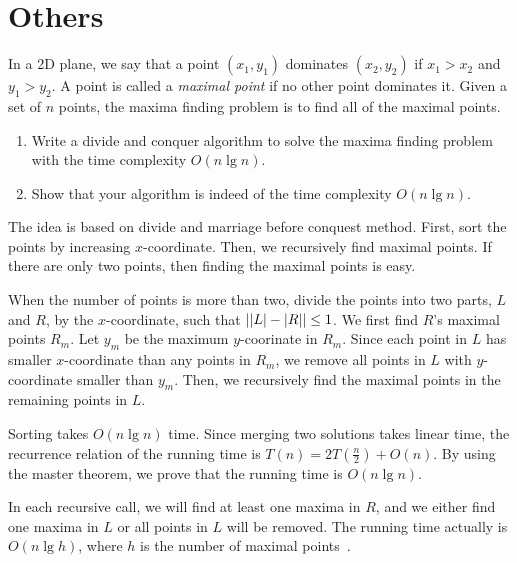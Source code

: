 \section{Others}

\begin{Exercise}[origin={NCU CSIE 98},title={Maximal points}]
In a 2D plane, we say that a point $(x_1, y_1)$ dominates $(x_2, y_2)$ if $x_1 > x_2$ and $y_1 > y_2$. A point is called a \emph{maximal point} if no other point dominates it. Given a set of $n$ points, the maxima finding problem is to find all of the maximal points.
\begin{enumerate}
\item Write a divide and conquer algorithm to solve the maxima finding problem with the time complexity $O(n \lg n)$.
\item Show that your algorithm is indeed of the time complexity $O(n \lg n)$. 
\end{enumerate}
\end{Exercise}
\begin{Answer}
The idea is based on divide and marriage before conquest method.
First, sort the points by increasing $x$-coordinate. Then, we recursively find maximal points. If there are only two points, then finding the maximal points is easy. 

When the number of points is more than two, divide the points into two parts, $L$ and $R$, by the $x$-coordinate, such that $\lvert\lvert L\rvert - \lvert R\rvert\rvert\leq 1$.
We first find $R$'s maximal points $R_m$.
Let $y_m$ be the maximum $y$-coorinate in $R_m$.
Since each point in $L$ has smaller $x$-coordinate than any points in $R_m$, we remove all points in $L$ with $y$-coordinate smaller than $y_m$.
Then, we recursively find the maximal points in the remaining points in $L$.

Sorting takes $O(n \lg n)$ time. Since merging two solutions takes linear time, the recurrence relation of the running time is $T(n) = 2T(\frac{n}{2}) + O(n)$. By using the master theorem, we prove that the running time is $O(n \lg n)$.

\begin{remark}
In each recursive call, we will find at least one maxima in $R$, and we either find one maxima in $L$ or all points in $L$ will be removed.
The running time actually is $O(n \lg h)$, where $h$ is the number of maximal points~\cite{Kirkpatrick1985}.
\end{remark}
\end{Answer}



\printbibliography[heading=subbibliography]
